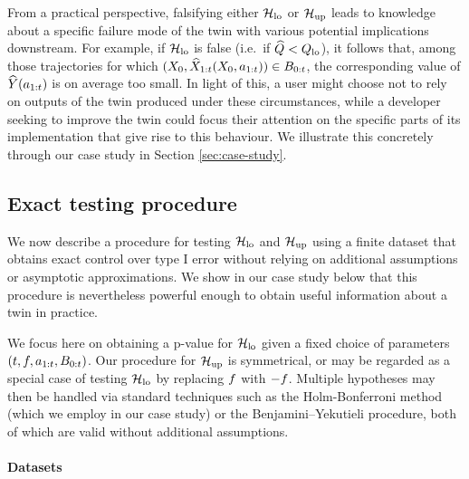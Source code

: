 From a practical perspective, falsifying either $\mathcal{H}_{\mathrm{lo}}$ or $\mathcal{H}_{\mathrm{up}}$ leads to knowledge about a specific failure mode of the twin with various potential implications downstream.
For example, if $\mathcal{H}_{\mathrm{lo}}$ is false (i.e.\ if $\widehat{Q} < Q_{\mathrm{lo}}$), it follows that, among those trajectories for which $(X_0, \widehat{X}_{1:t}(X_0, a_{1:t})) \in B_{0:t}$, the corresponding value of $\widehat{Y}(a_{1:t})$ is on average too small. %
In light of this, a user might choose not to rely on outputs of the twin produced under these circumstances, while a developer seeking to improve the twin could focus their attention on the specific parts of its implementation that give rise to this behaviour.
We illustrate this concretely through our case study in Section \ref{sec:case-study}.

%

%

%
%
%
%

%

\subsection{Exact testing procedure} \label{sec:statistical-methodology}

%
We now describe a procedure for testing $\mathcal{H}_{\mathrm{lo}}$ and $\mathcal{H}_{\mathrm{up}}$ using a finite dataset that obtains exact control over type I error without relying on additional assumptions or asymptotic approximations.
We show in our case study below that this procedure is nevertheless powerful enough to obtain useful information about a twin in practice.

%

%
%
%

%

%

%

%

We focus here on obtaining a p-value for $\mathcal{H}_{\mathrm{lo}}$ given a fixed choice of parameters $(t, f, a_{1:t}, B_{0:t})$.
Our procedure for $\mathcal{H}_{\mathrm{up}}$ is symmetrical, or may be regarded as a special case of testing $\mathcal{H}_{\mathrm{lo}}$ by replacing $f$ with $-f$.
Multiple hypotheses may then be handled via standard techniques such as the Holm-Bonferroni \cite{holm1979simple} method (which we employ in our case study) or the Benjamini–Yekutieli \cite{benjamini2001control} procedure, both of which are valid without additional assumptions.
%
%
%

\paragraph{Datasets}

